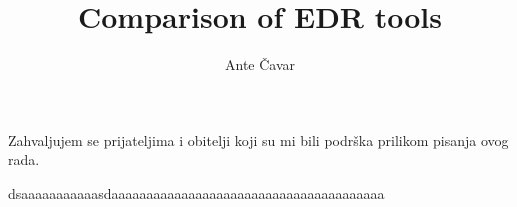 \documentclass[utf8, seminar]{fer}
\title{Comparison of EDR tools}
\author{Ante Čavar}
\renewcommand\thepage{}
\begin{document}
\maketitle
\begin{zahvale}
Zahvaljujem se prijateljima i obitelji koji su mi bili podrška prilikom pisanja ovog rada.
\end{zahvale}
\newpage
\tableofcontents
\newpage
\mainmatter%
\setcounter{page}{1}
\renewcommand\thepage{\arabic{page}}
% 
% 
% 
% 
% 
%










\newpage

\begin{sazetak}
\end{sazetak}
\newpage
\begin{abstract}
\end{abstract}

dsaaaaaaaaaaasdaaaaaaaaaaaaaaaaaaaaaaaaaaaaaaaaaaaaaaa
\newpage
\end{document}

